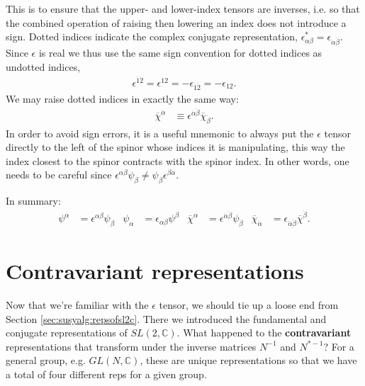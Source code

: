 This is to ensure that the upper- and lower-index tensors are inverses, i.e. so that the combined operation of raising then lowering an index does not introduce a sign.
%
Dotted indices indicate the complex conjugate representation, $\epsilon_{\alpha\beta}^{*} = \epsilon_{\dot\alpha\dot\beta}$. Since $\epsilon$ is real we thus use the same sign convention for dotted indices as undotted indices,
\begin{align}
    \epsilon^{\dot 1 \dot 2} = \epsilon^{12} = - \epsilon_{\dot 1 \dot 2} = - \epsilon_{12}.
\end{align}
%
We may raise dotted indices in exactly the same way:
\begin{align}
    \overline\chi^{\dot\alpha} &\equiv \epsilon^{\dot \alpha \dot \beta}\overline\chi_{\dot\beta}.
\end{align}
In order to avoid sign errors, it is a useful mnemonic to always put the $\epsilon$ tensor directly to the left of the spinor whose indices it is manipulating, this way the index closest to the spinor contracts with the spinor index. In other words, one needs to be careful since  $\epsilon^{\alpha\beta}\psi_\beta \neq \psi_\beta\epsilon^{\beta\alpha}$.
%

In summary:
\begin{align}
    \psi^\alpha &= \epsilon^{\alpha\beta}\psi_\beta & \psi_\alpha &= \epsilon_{\alpha\beta}\psi^\beta & \overline\chi^\alpha &= \epsilon^{\dot\alpha\dot\beta}\psi_{\dot\beta} & \overline\chi_{\dot\alpha} &= \epsilon_{\dot\alpha\dot\beta}\overline\chi^{\dot\beta}.
\end{align}


\section{Contravariant representations}
Now that we're familiar with the $\epsilon$ tensor, we should tie up a loose end from Section \ref{sec:susyalg:repsofsl2c}. There we introduced the fundamental and conjugate representations of $SL(2,\mathbb{C})$. What happened to the \textbf{contravariant} representations that transform under the inverse matrices $N^{-1}$ and $N^{*-1}$? For a general group, e.g. $GL(N,\mathbb{C})$, these are unique representations so that we have a total of four different reps for a given group.
%


